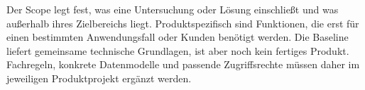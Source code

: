\begin{beginnerstatement}

Der Scope legt fest, was eine Untersuchung oder Lösung einschließt und was
außerhalb ihres Zielbereichs liegt. Produktspezifisch sind Funktionen, die erst
für einen bestimmten Anwendungsfall oder Kunden benötigt werden. Die Baseline
liefert gemeinsame technische Grundlagen, ist aber noch kein fertiges Produkt.
Fachregeln, konkrete Datenmodelle und passende Zugriffsrechte müssen daher im
jeweiligen Produktprojekt ergänzt werden.

\end{beginnerstatement}
